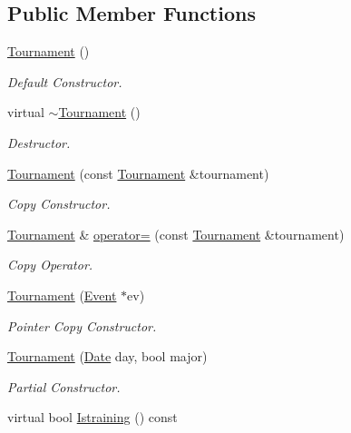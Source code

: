 \subsection*{Public Member Functions}
\begin{DoxyCompactItemize}
\item 
\hyperlink{class_tournament_a87cc832c6612caebcab61d1bea7ef1ac}{Tournament} ()
\begin{DoxyCompactList}\small\item\em Default Constructor. \end{DoxyCompactList}\item 
virtual \hyperlink{class_tournament_a255677d318362ae4dc23b9d6a3359f61}{$\sim$\+Tournament} ()
\begin{DoxyCompactList}\small\item\em Destructor. \end{DoxyCompactList}\item 
\hyperlink{class_tournament_a653ee8a664677bf0f757234150fa71f8}{Tournament} (const \hyperlink{class_tournament}{Tournament} \&tournament)
\begin{DoxyCompactList}\small\item\em Copy Constructor. \end{DoxyCompactList}\item 
\hyperlink{class_tournament}{Tournament} \& \hyperlink{class_tournament_a0eadb353ccff0b3c64b19d65f3353771}{operator=} (const \hyperlink{class_tournament}{Tournament} \&tournament)
\begin{DoxyCompactList}\small\item\em Copy Operator. \end{DoxyCompactList}\item 
\hyperlink{class_tournament_a38dbc53e1d0f1eaf6b661169db87c270}{Tournament} (\hyperlink{class_event}{Event} $\ast$ev)
\begin{DoxyCompactList}\small\item\em Pointer Copy Constructor. \end{DoxyCompactList}\item 
\hyperlink{class_tournament_a84c5301c50e0c4ac263ed3d74fa7c8c5}{Tournament} (\hyperlink{class_date}{Date} day, bool major)
\begin{DoxyCompactList}\small\item\em Partial Constructor. \end{DoxyCompactList}\item 
virtual bool \hyperlink{class_tournament_ab6fde765568ea9779fc10f0f2811c163}{Istraining} () const

\end{DoxyCompactItemize}
